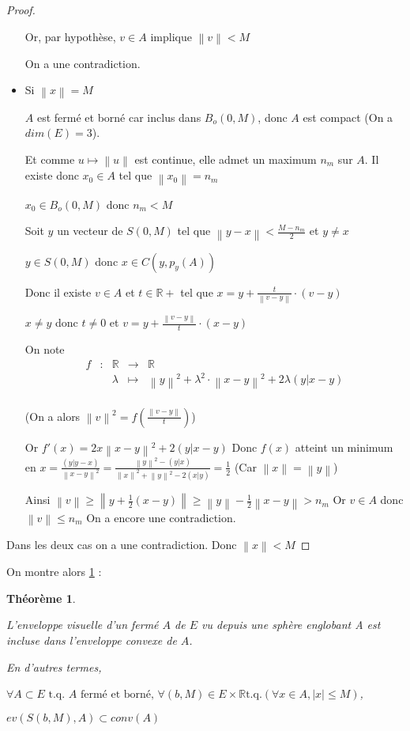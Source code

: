 \documentclass[a4paper]{article}
\newcommand{\norm}[1]{\left\lVert#1\right\rVert}
\newtheorem{theo}{Théorème}
\begin{document}
\begin{proof}
\begin{itemize}
Or, par hypothèse, $v \in A$ implique $\norm{v} < M$

On a une contradiction.

\item Si  $\norm{x} = M$

$A$ est fermé et borné car inclus dans $B_{o}(0, M)$, donc $A$ est compact (On a $dim(E) = 3$).

Et comme $u \mapsto \norm{u}$ est continue, elle admet un maximum $n_{m}$ sur $A$. Il existe donc $x_{0} \in A$ tel que $\norm{x_{0}} = n_{m}$

$x_{0} \in B_{o}(0, M)$ donc $n_{m} < M$

Soit $y$ un vecteur de $S(0, M)$ tel que $\norm{y - x} < \frac{M - n_{m}}{2}$ et $y \neq x$

$y \in S(0, M)$ donc $x \in C(y, p_{y}(A))$

Donc il existe $v \in A$ et $t \in \mathbb{R}+$ tel que $x = y + \frac{t}{\norm{v - y}} \cdot (v - y)$

$x \neq y$ donc $t \neq 0$ et $v = y + \frac{\norm{v - y}}{t} \cdot (x - y)$

On note 
\[\begin{array}{ccccc}
f & : & \mathbb{R} & \to & \mathbb{R} \\
 & & \lambda & \mapsto & \norm{y}^{2} + \lambda^{2} \cdot \norm{x - y}^{2} + 2 \lambda (y|x - y)\\
\end{array}\]

(On a alors $\norm{v}^{2} = f(\frac{\norm{v - y}}{t})$)

Or $f'(x) = 2 x \norm{x - y}^{2} + 2(y|x - y)$
Donc $f(x)$ atteint un minimum en $x = \frac{(y|y - x)}{\norm{x - y}^2} = \frac{\norm{y}^{2} - (y|x)}{\norm{x}^{2} + \norm{y}^{2} - 2 (x|y)} = \frac{1}{2}$ (Car $\norm{x} = \norm{y}$)

Ainsi $\norm{v} \geqslant \norm{y + \frac{1}{2} (x - y)} \geqslant \norm{y} - \frac{1}{2} \norm{x - y} > n_{m}$
Or $v \in A$  donc $\norm{v} \leqslant n_{m}$
On a encore une contradiction.
\end{itemize}
Dans les deux cas on a une contradiction.
Donc $\norm{x} < M$
\end{proof}


On montre alors \ref{th1} :

\begin{theo}\label{th1}

L'enveloppe visuelle d'un fermé $A$ de $E$ vu depuis une sphère englobant A est incluse dans l'enveloppe convexe de $A$.

En d'autres termes, 

$\forall A \subset E \text{ t.q. $A$ fermé et borné, } \forall (b, M) \in E \times \mathbb{R} \text{t.q.} (\forall x \in A, |x| \leqslant M)$,

$ev(S(b, M), A) \subset conv(A)$

\end{theo}
\end{document}
